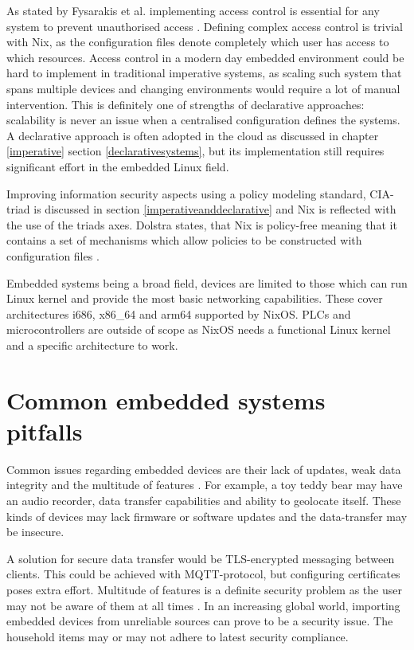 As stated by Fysarakis et al. implementing access control is essential
for any system to prevent unauthorised access
\cite{fysarakis2014embedded}. Defining complex access control is
trivial with Nix, as the configuration files denote completely which
user has access to which resources. Access control in a modern day
embedded environment could be hard to implement in traditional
imperative systems, as scaling such system that spans multiple devices
and changing environments would require a lot of manual
intervention. This is definitely one of strengths of declarative
approaches: scalability is never an issue when a centralised
configuration defines the systems. A declarative approach is often
adopted in the cloud as discussed in chapter \ref{imperative}
section \ref{declarativesystems}, but its implementation still
requires significant effort in the embedded Linux field.

Improving information security aspects using a policy
modeling standard, CIA-triad is discussed in section
\ref{imperativeanddeclarative} and Nix is reflected with the use of
the triads axes. Dolstra states, that Nix is policy-free meaning that
it contains a set of mechanisms which allow policies to be constructed
with configuration files \cite{dolstra2004nix}.

Embedded systems being a broad field,  devices are limited to
those which can run Linux kernel and provide the most basic networking
capabilities. These cover architectures i686, x86\_64 and arm64 supported
by NixOS. PLCs and microcontrollers are outside of scope as NixOS
needs a functional Linux kernel and a specific architecture to work.

\section{Common embedded systems pitfalls}

Common issues regarding embedded devices are their lack of updates,
weak data integrity and the multitude of features
\cite{kemmerer2003cybersecurity, fysarakis2014embedded}. For example,
a toy teddy bear may have an audio recorder, data transfer capabilities
and ability to geolocate itself. These kinds of devices may lack
firmware or software updates and the data-transfer may be insecure.

A solution for secure data transfer would be TLS-encrypted messaging
between clients. This could be achieved with MQTT-protocol, but
configuring certificates poses extra effort. Multitude of features is a
definite security problem as the user may not be aware of them at all
times \cite{fysarakis2014embedded}. In an increasing global world, importing embedded devices from
unreliable sources can prove to be a security issue. The household
items may or may not adhere to latest security
compliance. 

